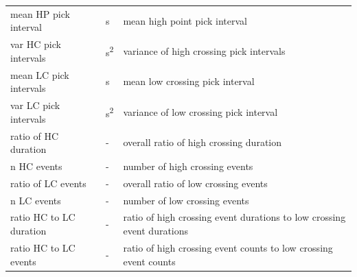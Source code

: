 \documentclass[10pt]{article}
\begin{document}
\begin{table}[h]
\begin{tabular}{lll}
    mean HP pick interval & \si{s} &  mean high point pick interval \\
    \addlinespace[2pt]
    var HC pick intervals & \si{s^2} &  variance of high crossing pick intervals \\
    \addlinespace[2pt]
    mean LC pick intervals & \si{s} &  mean low crossing pick interval \\
    \addlinespace[2pt]
    var LC pick intervals & \si{s^2} &  variance of low crossing pick interval \\
    \addlinespace[2pt]
    ratio of HC duration & - & overall ratio of high crossing duration \\
    \addlinespace[2pt]
    n HC events & - &  number of high crossing events \\
    \addlinespace[2pt]
    ratio of LC events & - &  overall ratio of low crossing events \\
    \addlinespace[2pt]
    n LC events & - &  number of low crossing events \\
    \addlinespace[2pt]
    ratio HC to LC duration & - &  ratio of high crossing event durations to low crossing event durations \\
    \addlinespace[2pt]
    ratio HC to LC events & - &  ratio of high crossing event counts to low crossing event counts \\

    \bottomrule
  \end{tabular}
\end{table}
\end{document}
